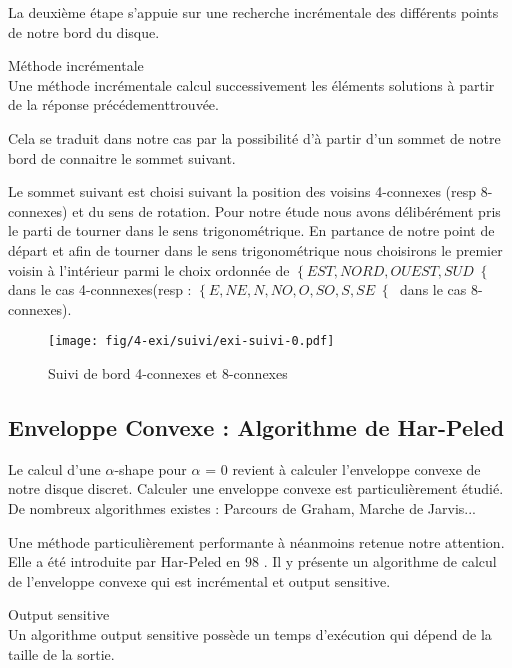 La deuxième étape s'appuie sur une recherche incrémentale des différents points de notre bord du disque.

\begin{Definition}{Méthode incrémentale}\\
\label{def:os}
      Une méthode incrémentale calcul successivement les éléments solutions à partir de la réponse précédementtrouvée.
\end{Definition}
Cela se traduit dans notre cas par la possibilité d'à partir d'un sommet de notre bord de connaitre le sommet suivant.

Le sommet suivant est choisi suivant la position des voisins 4-connexes (resp 8-connexes) et du sens de rotation. Pour notre étude nous avons délibérément pris le parti de tourner dans le sens trigonométrique. En partance de notre point de départ et afin de tourner dans le sens trigonométrique nous choisirons le premier voisin à l'intérieur parmi le choix ordonnée de $\left\{EST, NORD, OUEST, SUD\right\{$ dans le cas 4-connnexes(resp :  $\left\{E, NE, N, NO, O, SO, S, SE\right\{$ dans le cas 8-connexes).

\begin{figure}[h!]
  \centering
  \texttt{[image: fig/4-exi/suivi/exi-suivi-0.pdf]}
  \caption{Suivi de bord 4-connexes et 8-connexes}
\end{figure}
  

\subsection{Enveloppe Convexe : Algorithme de Har-Peled}

Le calcul d'une $\alpha$-shape pour $\alpha$ = 0 revient à calculer l'enveloppe convexe de notre disque discret. Calculer une enveloppe convexe est particulièrement étudié. De nombreux algorithmes existes : Parcours de Graham, Marche de Jarvis... 

Une méthode particulièrement performante à néanmoins retenue notre attention. Elle a été introduite par Har-Peled en 98 \cite{HarPeled98}. Il y présente un algorithme de calcul de l'enveloppe convexe qui est incrémental et output sensitive.


\begin{Definition}{Output sensitive}\\
\label{def:os}
      Un algorithme output sensitive possède un temps d’exécution qui dépend de la taille de la sortie.
\end{Definition}

